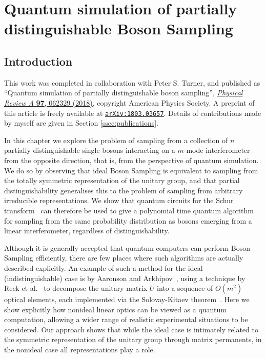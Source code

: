 \chapter{Quantum simulation of partially distinguishable Boson Sampling}
\label{chp:noisy_circuit}

\section{Introduction}

This work was completed in collaboration with Peter S. Turner, and published as ``Quantum simulation of partially distinguishable boson sampling'', \href{https://link.aps.org/doi/10.1103/PhysRevA.97.062329}{\textit{Physical Review A} \textbf{97}, 062329 (2018)}, copyright American Physics Society. A preprint of this article is freely available at {\tt \href{https://arxiv.org/abs/1803.03657}{arXiv:1803.03657}}. Details of contributions made by myself are given in Section \ref{ssec:publications}.

In this chapter we explore the problem of sampling from a collection of $n$ partially distinguishable single bosons interacting on a $m$-mode interferometer from the opposite direction, that is, from the perspective of quantum simulation. 
We do so by observing that ideal Boson Sampling is equivalent to sampling from the totally symmetric representation of the unitary group, and that partial distinguishability generalises this to the problem of sampling from arbitrary irreducible representations.
We show that quantum circuits for the Schur transform~\cite{bacon2007} can therefore be used to give a polynomial time quantum algorithm for sampling from the same probability distribution as bosons emerging from a linear interferometer, regardless of distinguishability.

Although it is generally accepted that quantum computers can perform Boson Sampling efficiently, there are few places where such algorithms are actually described explicitly. 
An example of such a method for the ideal (indistinguishable) case is by Aaronson and Arkhipov~\cite{aaronson2011}, using a technique by Reck et al.~\cite{reck1994} to decompose the unitary matrix $U$ into a sequence of $O(m^2)$ optical elements, each implemented via the Solovay-Kitaev theorem~\cite{nielsen2010}. 
Here we show explicitly how nonideal linear optics can be viewed as a quantum computation, allowing a wider range of realistic experimental situations to be considered.
Our approach shows that while the ideal case is intimately related to the symmetric representation of the unitary group through matrix permanents, in the nonideal case all representations play a role.

